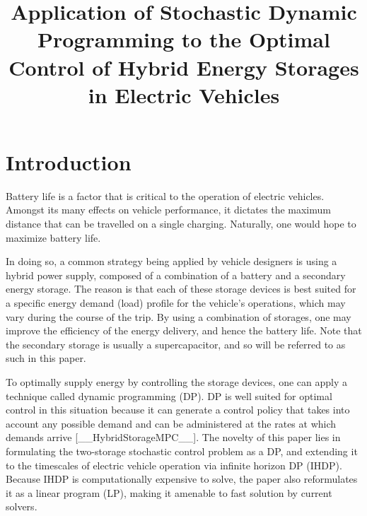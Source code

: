 \documentclass[conference]{IEEEtran}
\begin{document}
\title{Application of Stochastic Dynamic Programming to the Optimal Control of Hybrid Energy Storages in Electric Vehicles}

\author{
}


\maketitle


\section{Introduction}
Battery life is a factor that is critical to the operation of electric vehicles. Amongst its many effects on vehicle performance, it dictates the maximum distance that can be travelled on a single charging. Naturally, one would hope to maximize battery life.

In doing so, a common strategy being applied by vehicle designers is using a hybrid power supply, composed of a combination of a battery and a secondary energy storage. \cite{thounthong2009energy} The reason is that each of these storage devices is best suited for a specific energy demand (load) profile for the vehicle's operations, which may vary during the course of the trip. \cite{thounthong2009energy} By using a combination of storages, one may improve the efficiency of the energy delivery, and hence the battery life. Note that the secondary storage is usually a supercapacitor, and so will be referred to as such in this paper.

To optimally supply energy by controlling the storage devices, one can apply a technique called dynamic programming (DP). DP is well suited for optimal control in this situation because it can generate a control policy that takes into account any possible demand and can be administered at the rates at which demands arrive [__HybridStorageMPC__]. The novelty of this paper lies in formulating the two-storage stochastic control problem as a DP, and extending it to the timescales of electric vehicle operation via infinite horizon DP (IHDP). Because IHDP is computationally expensive to solve, the paper also reformulates it as a linear program (LP), making it amenable to fast solution by current solvers. 
\end{document}
